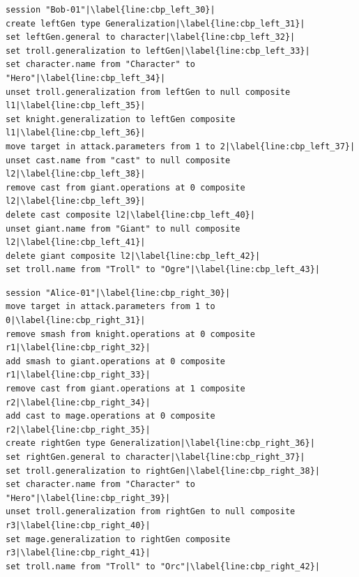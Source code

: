 \vspace{-20pt}
\begin{lstlisting}[firstnumber=30,style=eol,escapechar=|,caption={The appended events made by Bob to produce the left version in Figure \ref{fig:class_diagram_left} (left version).},label=lst:cbp_left]
session "Bob-01"|\label{line:cbp_left_30}|
create leftGen type Generalization|\label{line:cbp_left_31}|
set leftGen.general to character|\label{line:cbp_left_32}|
set troll.generalization to leftGen|\label{line:cbp_left_33}|
set character.name from "Character" to "Hero"|\label{line:cbp_left_34}|
unset troll.generalization from leftGen to null composite l1|\label{line:cbp_left_35}|
set knight.generalization to leftGen composite l1|\label{line:cbp_left_36}|
move target in attack.parameters from 1 to 2|\label{line:cbp_left_37}|
unset cast.name from "cast" to null composite l2|\label{line:cbp_left_38}|
remove cast from giant.operations at 0 composite l2|\label{line:cbp_left_39}|
delete cast composite l2|\label{line:cbp_left_40}|
unset giant.name from "Giant" to null composite l2|\label{line:cbp_left_41}|
delete giant composite l2|\label{line:cbp_left_42}|
set troll.name from "Troll" to "Ogre"|\label{line:cbp_left_43}|
\end{lstlisting}

\vspace{-20pt}
\begin{lstlisting}[firstnumber=30,style=eol,escapechar=|,caption={The appended events made by Alice to produce the right version in Figure \ref{fig:class_diagram_right} (right version).},label=lst:cbp_right]
session "Alice-01"|\label{line:cbp_right_30}|
move target in attack.parameters from 1 to 0|\label{line:cbp_right_31}|
remove smash from knight.operations at 0 composite r1|\label{line:cbp_right_32}|
add smash to giant.operations at 0 composite r1|\label{line:cbp_right_33}|
remove cast from giant.operations at 1 composite r2|\label{line:cbp_right_34}|
add cast to mage.operations at 0 composite r2|\label{line:cbp_right_35}|
create rightGen type Generalization|\label{line:cbp_right_36}|
set rightGen.general to character|\label{line:cbp_right_37}|
set troll.generalization to rightGen|\label{line:cbp_right_38}|
set character.name from "Character" to "Hero"|\label{line:cbp_right_39}|
unset troll.generalization from rightGen to null composite r3|\label{line:cbp_right_40}|
set mage.generalization to rightGen composite r3|\label{line:cbp_right_41}|
set troll.name from "Troll" to "Orc"|\label{line:cbp_right_42}|
\end{lstlisting}

